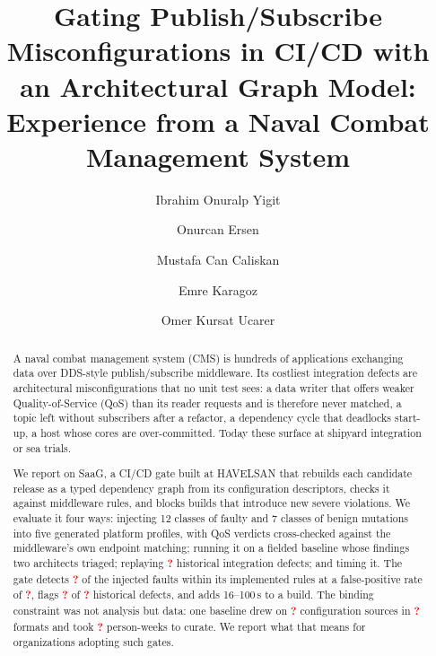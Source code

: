 \documentclass[sigconf,screen]{acmart}
\newcommand{\tbd}{\textcolor{red}{\textbf{?}}}
\begin{document}
\title[Gating Pub/Sub Misconfigurations in CI/CD]{Gating Publish/Subscribe Misconfigurations in CI/CD with an Architectural Graph Model: Experience from a Naval Combat Management System}

\author{Ibrahim Onuralp Yigit}

\author{Onurcan Ersen}

\author{Mustafa Can Caliskan}

\author{Emre Karagoz}

\author{Omer Kursat Ucarer}

\begin{abstract}
A naval combat management system (CMS) is hundreds of applications exchanging data over DDS-style publish/subscribe middleware. Its costliest integration defects are architectural misconfigurations that no unit test sees: a data writer that offers weaker Quality-of-Service (QoS) than its reader requests and is therefore never matched, a topic left without subscribers after a refactor, a dependency cycle that deadlocks start-up, a host whose cores are over-committed. Today these surface at shipyard integration or sea trials.

We report on SaaG, a CI/CD gate built at HAVELSAN that rebuilds each candidate release as a typed dependency graph from its configuration descriptors, checks it against middleware rules, and blocks builds that introduce new severe violations. We evaluate it four ways: injecting 12 classes of faulty and 7 classes of benign mutations into five generated platform profiles, with QoS verdicts cross-checked against the middleware's own endpoint matching; running it on a fielded baseline whose findings two architects triaged; replaying \tbd{} historical integration defects; and timing it. The gate detects \tbd{} of the injected faults within its implemented rules at a false-positive rate of \tbd{}, flags \tbd{} of \tbd{} historical defects, and adds 16--100\,s to a build. The binding constraint was not analysis but data: one baseline drew on \tbd{} configuration sources in \tbd{} formats and took \tbd{} person-weeks to curate. We report what that means for organizations adopting such gates.
\end{abstract}
\end{document}
